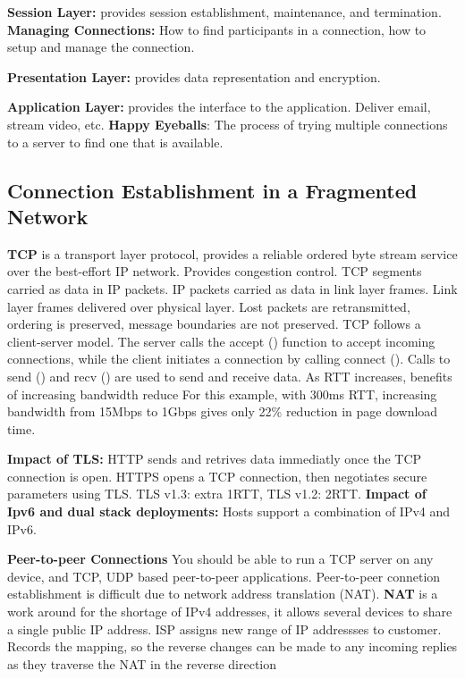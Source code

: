 \documentclass{article}
\begin{document}
\textbf{Session Layer:} provides session establishment, maintenance, and termination.
\textbf{Managing Connections:} How to find participants in a connection, how to setup and manage the connection.

\textbf{Presentation Layer:} provides data representation and encryption.

\textbf{Application Layer:} provides the interface to the application. Deliver email, stream video, etc.
\textbf{Happy Eyeballs}: The process of trying multiple connections to a server to find one that is available.


\clearpage

\subsection*{Connection Establishment in a Fragmented Network}

\textbf{TCP} is a transport layer protocol, provides a reliable ordered byte stream service over the
best-effort IP network. Provides congestion control.
TCP segments carried as data in IP packets.
IP packets carried as data in link layer frames. Link layer frames delivered over physical layer.
Lost packets are retransmitted, ordering is preserved, message boundaries are not preserved.
TCP follows a client-server model.
The server calls the accept () function to accept incoming connections, while the client initiates a connection by calling connect ().
Calls to send () and recv () are used to send and receive data.
As RTT increases, benefits of increasing bandwidth reduce
For this example, with 300ms RTT, increasing bandwidth from 15Mbps to 1Gbps gives only 22\% reduction in page download time.

\vspace{\baselineskip}
\textbf{Impact of TLS:}
HTTP sends and retrives data immediatly once the TCP connection is open.
HTTPS opens a TCP connection, then negotiates secure parameters using TLS.\@
TLS v1.3: extra 1RTT, TLS v1.2: 2RTT.\@
\textbf{Impact of Ipv6 and dual stack deployments:}
Hosts support a combination of IPv4 and IPv6.

\vspace{\baselineskip}
\textbf{Peer-to-peer Connections}
You should be able to run a TCP server on any device, and TCP, UDP based peer-to-peer applications.
Peer-to-peer connetion establishment is difficult due to network address translation (NAT).
\textbf{NAT} is a work around for the shortage of IPv4 addresses, it allows several devices to share a single public IP address.
ISP assigns new range of IP addressses to customer.
Records the mapping, so the reverse changes can be made to any incoming replies as they traverse the NAT in the reverse direction
\end{document}
